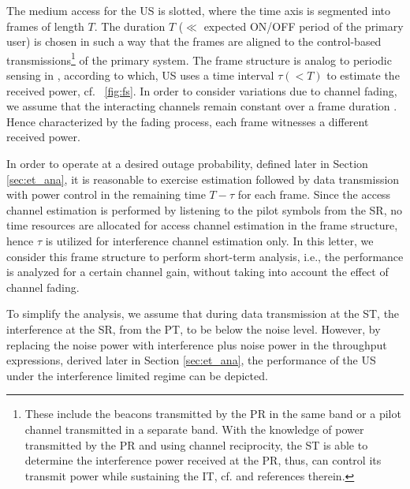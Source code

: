 \documentclass[letterpaper, twocolumn]{IEEEtran}
\begin{document}
The medium access for the US is slotted, where the time axis is segmented into frames of length $T$. The duration $T$ ($\ll$ expected ON/OFF period of the primary user) is chosen in such a way that the frames are aligned to the control-based transmissions\footnote{These include the beacons transmitted by the PR in the same band or a pilot channel transmitted in a separate band. With the knowledge of power transmitted by the PR and using channel reciprocity, the ST is able to determine the interference power received at the PR, thus, can control its transmit power while sustaining the IT, cf. \cite{Kaushik15} and references therein.} of the primary system. The frame structure is analog to periodic sensing in \cite{Kaushik15}, according to which, US uses a time interval $\tau (< T)$ to estimate the received power, cf. \figurename~\ref{fig:fs}. In order to consider variations due to channel fading, we assume that the interacting channels remain constant over a frame duration \cite{Kaushik15}. Hence characterized by the fading process, each frame witnesses a different received power. 

In order to operate at a desired outage probability, defined later in Section \ref{sec:et_ana}, it is reasonable to exercise estimation followed by data transmission with power control in the remaining time $T - \tau$ for each frame. %
Since the access channel estimation is performed by listening to the pilot symbols from the SR, no time resources are allocated for access channel estimation in the frame structure, hence $\tau$ is utilized for interference channel estimation only. 
In this letter, we consider this frame structure to perform short-term analysis, i.e., the performance is analyzed for a certain channel gain, without taking into account the effect of channel fading.%



To simplify the analysis, we assume that during data transmission at the ST, the interference at the SR, from the PT, to be below the noise level. However, by replacing the noise power with interference plus noise power in the throughput expressions, derived later in Section \ref{sec:et_ana}, the performance of the US under the interference limited regime can be depicted. %
\end{document}
